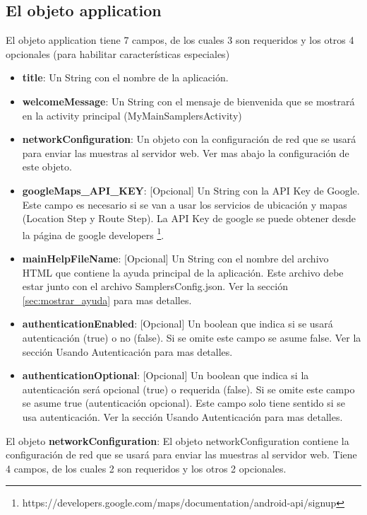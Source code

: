 \subsection{El objeto application}
	El objeto application tiene 7 campos, de los cuales 3 son requeridos y los otros 4 opcionales (para habilitar características especiales)
	\begin{itemize}
		\item \textbf{title}: Un String con el nombre de la aplicación.
		
		 \item \textbf{welcomeMessage}: Un String con el mensaje de bienvenida que se mostrará en la activity principal (MyMainSamplersActivity)
		 
		 \item \textbf{networkConfiguration}: Un objeto con la configuración de red que se usará para enviar las muestras al servidor web. Ver mas abajo la configuración de este objeto.
		 
		 \item \textbf{googleMaps\_API\_KEY}: [Opcional] Un String con la API Key de Google. Este campo es necesario si se van a usar los servicios de ubicación y mapas (Location Step y Route Step). La API Key de google se puede obtener desde la página de google developers \footnote{https://developers.google.com/maps/documentation/android-api/signup}.
		 
		 \item \textbf{mainHelpFileName}: [Opcional] Un String con el nombre del archivo HTML que contiene la ayuda principal de la aplicación. Este archivo debe estar junto con el archivo SamplersConfig.json. Ver la sección \ref{sec:mostrar_ayuda} para mas detalles.
		 
		 \item \textbf{authenticationEnabled}: [Opcional] Un boolean que indica si se usará autenticación (true) o no (false). Si se omite este campo se asume false. Ver la sección Usando Autenticación para mas detalles.
		 
		 \item \textbf{authenticationOptional}: [Opcional] Un boolean que indica si la autenticación será opcional (true) o requerida (false). Si se omite este campo se asume true (autenticación opcional). Este campo solo tiene sentido si se usa autenticación. Ver la sección Usando Autenticación para mas detalles.
		 
	\end{itemize}
	
	
	El objeto \textbf{networkConfiguration}:
	El objeto networkConfiguration contiene la configuración de red que se usará para enviar las muestras al servidor web. Tiene 4 campos, de los cuales 2 son requeridos y los otros 2 opcionales.
	
